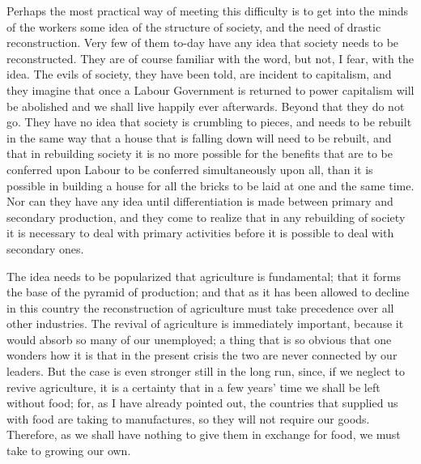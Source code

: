\documentclass{book}
\begin{document}
Perhaps the most practical way of meeting this difficulty is to get into the minds of the workers some idea of the structure of society, and the need of drastic reconstruction. Very few of them to-day have any idea that society needs to be reconstructed. They are of course familiar with the word, but not, I fear, with the idea. The evils of society, they have been told, are incident to capitalism, and they imagine that once a Labour Government is returned to power capitalism will be abolished and we shall live happily ever afterwards. Beyond that they do not go. They have no idea that society is crumbling to pieces, and needs to be rebuilt in the same way that a house that is falling down will need to be rebuilt, and that in rebuilding society it is no more possible for the benefits that are to be conferred upon Labour to be conferred simultaneously upon all, than it is possible in building a house for all the bricks to be laid at one and the same time. Nor can they have any idea until differentiation is made between primary and secondary production, and they come to realize that in any rebuilding of society it is necessary to deal with primary activities before it is possible to deal with secondary ones.

The idea needs to be popularized that agriculture is fundamental; that it forms the base of the pyramid of production; and that as it has been allowed to decline in this country the reconstruction of agriculture must take precedence over all other industries. The revival of agriculture is immediately important, because it would absorb so many of our unemployed; a thing that is so obvious that one wonders how it is that in the present crisis the two are never connected by our leaders. But the case is even stronger still in the long run, since, if we neglect to revive agriculture, it is a certainty that in a few years’ time we shall be left without food; for, as I have already pointed out, the countries that supplied us with food are taking to manufactures, so they will not require our goods. Therefore, as we shall have nothing to give them in exchange for food, we must take to growing our own.
\end{document}
